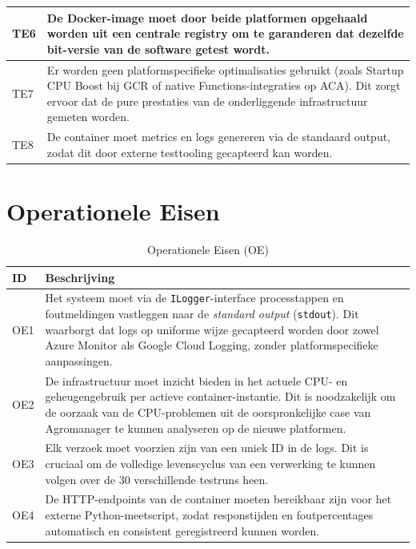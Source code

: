 \begin{table}[H]
\begin{tabular}{|l|p{15cm}|}
        TE6 & De Docker-image moet door beide platformen opgehaald worden uit een centrale registry om te garanderen dat dezelfde bit-versie van de software getest wordt. \\ \hline
        TE7 & Er worden geen platformspecifieke optimalisaties gebruikt (zoals Startup CPU Boost bij GCR of native Functions-integraties op ACA). Dit zorgt ervoor dat de pure prestaties van de onderliggende infrastructuur gemeten worden. \\ \hline
        TE8 & De container moet metrics en logs genereren via de standaard output, zodat dit door externe testtooling gecapteerd kan worden. \\ \hline
    \end{tabular}
\end{table}

\section{Operationele Eisen}
\begin{table}[H]
    \centering
    \caption{Operationele Eisen (OE)}
    \label{tab:operationele_eisen}
    \begin{tabular}{|l|p{15cm}|}
        \hline
        \textbf{ID} & \textbf{Beschrijving} \\ \hline
        OE1 & Het systeem moet via de \texttt{ILogger}-interface processtappen en foutmeldingen vastleggen naar de \textit{standard output} (\texttt{stdout}). Dit waarborgt dat logs op uniforme wijze gecapteerd worden door zowel Azure Monitor als Google Cloud Logging, zonder platformspecifieke aanpassingen. \\ \hline
        OE2 & De infrastructuur moet inzicht bieden in het actuele CPU- en geheugengebruik per actieve container-instantie. Dit is noodzakelijk om de oorzaak van de CPU-problemen uit de oorspronkelijke case van Agromanager te kunnen analyseren op de nieuwe platformen. \\ \hline
        OE3 & Elk verzoek moet voorzien zijn van een uniek ID in de logs. Dit is cruciaal om de volledige levenscyclus van een verwerking te kunnen volgen over de 30 verschillende testruns heen. \\ \hline
        OE4 & De HTTP-endpoints van de container moeten bereikbaar zijn voor het externe Python-meetscript, zodat responstijden en foutpercentages automatisch en consistent geregistreerd kunnen worden. \\ \hline
    \end{tabular}
\end{table}